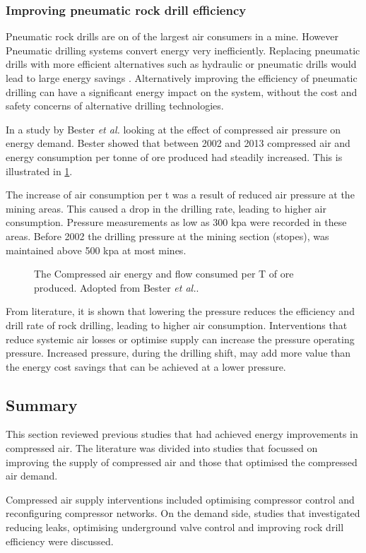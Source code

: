 		\subsubsection{Improving pneumatic rock drill efficiency}
		 Pneumatic rock drills are on of the largest air consumers in a mine. However Pneumatic drilling systems convert energy very inefficiently. Replacing pneumatic drills with more efficient alternatives such as hydraulic or pneumatic drills would lead to large energy savings \cite{Pascoe2016Masters}.  Alternatively improving the efficiency of pneumatic drilling can have a significant energy impact on the system, without the cost and safety concerns of alternative drilling technologies.
		 \par 
		 In a study by  Bester \textit{et al.} \cite{bester2013effect} looking at the effect of compressed air pressure on energy demand. Bester showed that between 2002 and 2013 compressed air and energy consumption per tonne of ore produced had steadily increased. This is illustrated  in \cref{fig: Compressed energy and air flow per ton}. 
		  \par
		 The increase of air consumption per \gls{t} was a result of reduced air pressure at the mining areas. This caused a drop in the drilling rate, leading to higher air consumption. Pressure measurements as low as 300 \gls{kpa} were recorded in these areas. Before 2002 the drilling pressure at the mining section (stopes), was maintained above 500 \gls{kpa} at most mines. 
		 \par 
		 \begin{figure}[h]
		 	\centering
		 	
		 	\caption[The Compressed air energy and flow consumed per T of ore produced.]{The Compressed air energy and flow consumed per T of ore produced. Adopted from Bester \textit{et al.}\cite{bester2013effect}.}
		 	\label{fig: Compressed energy and air flow per ton}
		 \end{figure}
		 From literature, it is shown that lowering the pressure reduces the efficiency and drill rate of rock drilling, leading to higher air consumption. Interventions that reduce systemic air losses or optimise supply can increase the pressure operating pressure. Increased pressure, during the drilling shift, may add more value than the energy cost savings that can be achieved at a lower pressure.
	\subsection{Summary}
	This section reviewed previous studies that had achieved energy improvements in compressed air. The literature was divided into studies that focussed on improving the supply of compressed air and those that optimised the compressed air demand.
	\par
	Compressed air supply interventions included optimising compressor control and reconfiguring compressor networks. On the demand side, studies that investigated reducing leaks, optimising underground valve control and improving rock drill efficiency were discussed.
